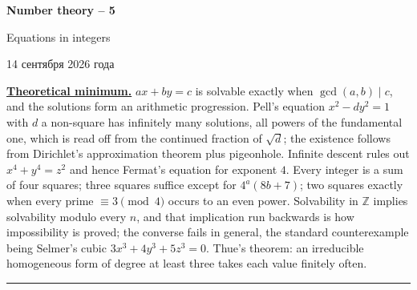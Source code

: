 \documentclass[11pt,a4paper]{article}
\newcommand{\head}[1]{\par\medskip\noindent\textbf{\underline{#1}}\quad}
\newcommand{\sheettitle}[4]{%
  \begin{center}
  {\huge\bfseries #1\par}\vspace{1.2em}
  {\Large #2\par}\vspace{0.8em}
  \if\relax\detokenize{#3}\relax\else{\Large #3\par}\vspace{0.8em}\fi
  {\foreignlanguage{russian}{#4}\par}
  \end{center}\vspace{0.5em}}
\begin{document}
\sheettitle{Number theory -- 5}{Equations in integers}{Homework}{14 сентября 2026 года}

\head{Theoretical minimum.} $ax+by=c$ is solvable exactly when $\gcd(a,b)\mid c$, and the
solutions form an arithmetic progression. Pell's equation $x^2-dy^2=1$ with $d$ a non-square has
infinitely many solutions, all powers of the fundamental one, which is read off from the continued
fraction of $\sqrt d$; the existence follows from Dirichlet's approximation theorem plus pigeonhole.
Infinite descent rules out $x^4+y^4=z^2$ and hence Fermat's equation for exponent $4$. Every
integer is a sum of four squares; three squares suffice except for $4^a(8b+7)$; two squares exactly
when every prime $\equiv3\pmod 4$ occurs to an even power. Solvability in $\mathbb Z$ implies
solvability modulo every $n$, and that implication run backwards is how impossibility is proved;
the converse fails in general, the standard counterexample being Selmer's cubic
$3x^3+4y^3+5z^3=0$. Thue's theorem: an irreducible homogeneous form of degree at least three takes
each value finitely often.

\medskip\noindent\rule{\linewidth}{0.4pt}
\end{document}
